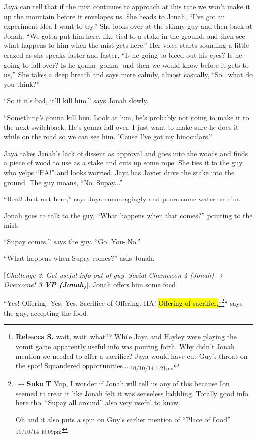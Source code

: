 Jaya can tell that if the mist continues to approach at this rate we won't make it up the mountain before it envelopes us.  She heads to Jonah, ``I've got an experiment idea I want to try.''  She looks over at the skinny guy and then back at Jonah. ``We gotta put him here, like tied to a stake in the ground, and then see what happens to him when the mist gets here.''  Her voice starts sounding a little crazed as she speaks faster and faster, ``Is he going to bleed out his eyes?  Is he going to fall over?  Is he gonna- gonna- and then we would know before it gets to us,''  She takes a deep breath and says more calmly, almost casually, ``So...what do you think?''

``So if it's bad, it'll kill him,'' says Jonah slowly.

``Something's gonna kill him.  Look at him, he's probably not going to make it to the next switchback.  He's gonna fall over.  I just want to make sure he does it while on the road so we can see him.  'Cause I've got my binoculars.''

Jaya takes Jonah's lack of dissent as approval and goes into the woods and finds a piece of wood to use as a stake and cuts up some rope.  She ties it to the guy who yelps ``HA!'' and looks worried.  Jaya has Javier drive the stake into the ground.  The guy moans, ``No.  Supay...''

``Rest!  Just rest here,'' says Jaya encouragingly and pours some water on him.

Jonah goes to talk to the guy, ``What happens when that comes?'' pointing to the mist.

``Supay comes,'' says the guy.  ``Go.  You- No.''

``What happens when Supay comes?'' asks Jonah.

{[}\textit{Challenge 3: Get useful info out of guy.  Social Chameleon 4 (Jonah) → Overcome! }\textit{\textbf{3 VP (Jonah)}}{]}.  Jonah offers him some food.

``Yes!  Offering.  Yes.  Yes.  Sacrifice of Offering.  HA! \hl{Offering of sacrifice,}\footnote{\textbf{Rebecca S. }wait, wait, what?? While Jaya and Hayley were playing the vomit game apparently useful info was pouring forth.  Why didn't Jonah mention we needed to offer a sacrifice? Jaya would have cut Guy's throat on the spot! 
Squandered opportunities... \textsubscript{10/10/14 7:21pm}}\footnote{$\rightarrow$\textbf{Suko T }Yup, I wonder if Jonah will tell us any of this because Ion seemed to treat it like Jonah felt it was senseless babbling.  Totally good info here tho.  ``Supay all around'' also very useful to know.

Oh and it also puts a spin on Guy's earlier mention of ``Place of Food'' \textsubscript{10/10/14 10:09pm}}`` says the guy, accepting the food.

